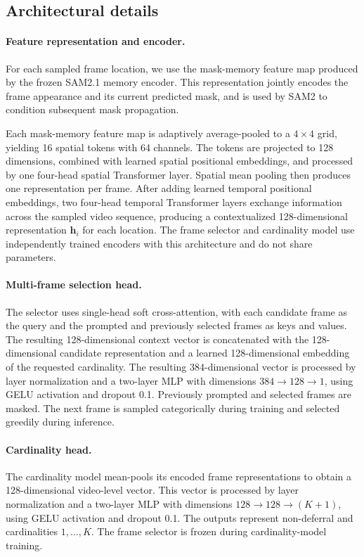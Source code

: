 \subsection{Architectural details}

\paragraph{Feature representation and encoder.}
For each sampled frame location, we use the mask-memory feature map produced
by the frozen SAM2.1 memory encoder. This representation jointly encodes the
frame appearance and its current predicted mask, and is used by SAM2 to
condition subsequent mask propagation.

Each mask-memory feature map is adaptively average-pooled to a \(4\times4\)
grid, yielding 16 spatial tokens with 64 channels. The tokens are projected to
128 dimensions, combined with learned spatial positional embeddings, and
processed by one four-head spatial Transformer layer. Spatial mean pooling
then produces one representation per frame. After adding learned temporal
positional embeddings, two four-head temporal Transformer layers exchange
information across the sampled video sequence, producing a contextualized
128-dimensional representation \(\mathbf{h}_i\) for each location. The frame
selector and cardinality model use independently trained encoders with this
architecture and do not share parameters.

\paragraph{Multi-frame selection head.}
The selector uses single-head soft cross-attention, with each candidate frame
as the query and the prompted and previously selected frames as keys and
values. The resulting 128-dimensional context vector is concatenated with the
128-dimensional candidate representation and a learned 128-dimensional
embedding of the requested cardinality. The resulting 384-dimensional vector
is processed by layer normalization and a two-layer MLP with dimensions
\(384\rightarrow128\rightarrow1\), using GELU activation and dropout 0.1.
Previously prompted and selected frames are masked. The next frame is sampled
categorically during training and selected greedily during inference.



\paragraph{Cardinality head.}
The cardinality model mean-pools its encoded frame representations to obtain a
128-dimensional video-level vector. This vector is processed by layer
normalization and a two-layer MLP with dimensions
\(128\rightarrow128\rightarrow(K+1)\), using GELU activation and dropout 0.1.
The outputs represent non-deferral and cardinalities \(1,\ldots,K\). The frame
selector is frozen during cardinality-model training.

